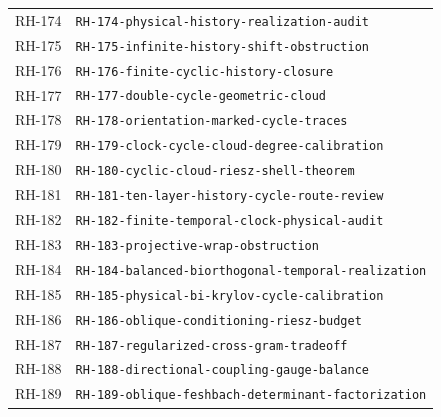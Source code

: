 \begin{longtable}{r >{\raggedright\arraybackslash}p{}}
RH-174 & \texttt{RH-\allowbreak{}174-\allowbreak{}physical-\allowbreak{}history-\allowbreak{}realization-\allowbreak{}audit}\\
RH-175 & \texttt{RH-\allowbreak{}175-\allowbreak{}infinite-\allowbreak{}history-\allowbreak{}shift-\allowbreak{}obstruction}\\
RH-176 & \texttt{RH-\allowbreak{}176-\allowbreak{}finite-\allowbreak{}cyclic-\allowbreak{}history-\allowbreak{}closure}\\
RH-177 & \texttt{RH-\allowbreak{}177-\allowbreak{}double-\allowbreak{}cycle-\allowbreak{}geometric-\allowbreak{}cloud}\\
RH-178 & \texttt{RH-\allowbreak{}178-\allowbreak{}orientation-\allowbreak{}marked-\allowbreak{}cycle-\allowbreak{}traces}\\
RH-179 & \texttt{RH-\allowbreak{}179-\allowbreak{}clock-\allowbreak{}cycle-\allowbreak{}cloud-\allowbreak{}degree-\allowbreak{}calibration}\\
RH-180 & \texttt{RH-\allowbreak{}180-\allowbreak{}cyclic-\allowbreak{}cloud-\allowbreak{}riesz-\allowbreak{}shell-\allowbreak{}theorem}\\
RH-181 & \texttt{RH-\allowbreak{}181-\allowbreak{}ten-\allowbreak{}layer-\allowbreak{}history-\allowbreak{}cycle-\allowbreak{}route-\allowbreak{}review}\\
RH-182 & \texttt{RH-\allowbreak{}182-\allowbreak{}finite-\allowbreak{}temporal-\allowbreak{}clock-\allowbreak{}physical-\allowbreak{}audit}\\
RH-183 & \texttt{RH-\allowbreak{}183-\allowbreak{}projective-\allowbreak{}wrap-\allowbreak{}obstruction}\\
RH-184 & \texttt{RH-\allowbreak{}184-\allowbreak{}balanced-\allowbreak{}biorthogonal-\allowbreak{}temporal-\allowbreak{}realization}\\
RH-185 & \texttt{RH-\allowbreak{}185-\allowbreak{}physical-\allowbreak{}bi-\allowbreak{}krylov-\allowbreak{}cycle-\allowbreak{}calibration}\\
RH-186 & \texttt{RH-\allowbreak{}186-\allowbreak{}oblique-\allowbreak{}conditioning-\allowbreak{}riesz-\allowbreak{}budget}\\
RH-187 & \texttt{RH-\allowbreak{}187-\allowbreak{}regularized-\allowbreak{}cross-\allowbreak{}gram-\allowbreak{}tradeoff}\\
RH-188 & \texttt{RH-\allowbreak{}188-\allowbreak{}directional-\allowbreak{}coupling-\allowbreak{}gauge-\allowbreak{}balance}\\
RH-189 & \texttt{RH-\allowbreak{}189-\allowbreak{}oblique-\allowbreak{}feshbach-\allowbreak{}determinant-\allowbreak{}factorization}\\

\end{longtable}
